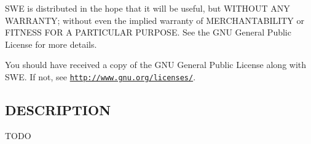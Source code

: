 S\-W\-E is distributed in the hope that it will be useful, but W\-I\-T\-H\-O\-U\-T A\-N\-Y W\-A\-R\-R\-A\-N\-T\-Y; without even the implied warranty of M\-E\-R\-C\-H\-A\-N\-T\-A\-B\-I\-L\-I\-T\-Y or F\-I\-T\-N\-E\-S\-S F\-O\-R A P\-A\-R\-T\-I\-C\-U\-L\-A\-R P\-U\-R\-P\-O\-S\-E. See the G\-N\-U General Public License for more details.

You should have received a copy of the G\-N\-U General Public License along with S\-W\-E. If not, see \href{http://www.gnu.org/licenses/}{\tt http\-://www.\-gnu.\-org/licenses/}.\hypertarget{NetCdfWriter_8hh_DESCRIPTION}{}\subsection{D\-E\-S\-C\-R\-I\-P\-T\-I\-O\-N}\label{NetCdfWriter_8hh_DESCRIPTION}
T\-O\-D\-O 